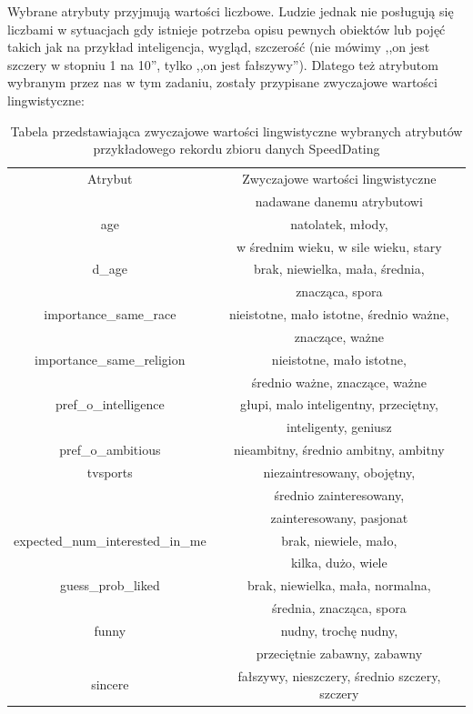 \documentclass{classrep}
\begin{document}
Wybrane atrybuty przyjmują wartości liczbowe. Ludzie jednak nie posługują się liczbami w sytuacjach gdy istnieje potrzeba opisu pewnych obiektów lub pojęć takich jak na przykład inteligencja, wygląd, szczerość (nie mówimy ,,on jest szczery w stopniu 1 na 10'', tylko ,,on jest fałszywy''). Dlatego też atrybutom wybranym przez nas w tym zadaniu, zostały przypisane zwyczajowe wartości lingwistyczne:
\begin{table}[H]
\centering
\begin{tabular}{|c|c|}
\hline
Atrybut & Zwyczajowe wartości lingwistyczne \\ & nadawane danemu atrybutowi \\ \hline
age & natolatek, młody, \\ & w średnim wieku, w sile wieku, stary \\ \hline
d\_age & brak, niewielka, mała, średnia,\\ &  znacząca, spora \\ \hline
importance\_same\_race & nieistotne, mało istotne, średnio ważne, \\ & znaczące, ważne \\ \hline
importance\_same\_religion & nieistotne, mało istotne, \\ & średnio ważne, znaczące, ważne \\ \hline
pref\_o\_intelligence & głupi, malo inteligentny, przeciętny, \\ & inteligenty, geniusz \\ \hline
pref\_o\_ambitious & nieambitny, średnio ambitny, ambitny \\ \hline
tvsports & niezaintresowany, obojętny, \\ & średnio zainteresowany, \\ & zainteresowany, pasjonat \\ \hline
expected\_num\_interested\_in\_me & brak, niewiele, mało, \\ & kilka, dużo, wiele \\ \hline
guess\_prob\_liked & brak, niewielka, mała, normalna, \\ & średnia, znacząca, spora \\ \hline
funny & nudny, trochę nudny, \\ & przeciętnie zabawny, zabawny \\ \hline
sincere & fałszywy, nieszczery, średnio szczery, szczery \\ \hline
\end{tabular}
\caption{Tabela przedstawiająca zwyczajowe wartości lingwistyczne wybranych atrybutów przykładowego rekordu zbioru danych SpeedDating \cite{database}}
\end{table}
\end{document}
